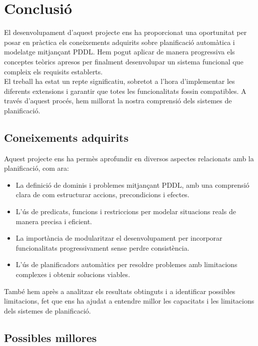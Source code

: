 \documentclass[a4paper]{article}
\begin{document}
	\newpage
	\section{Conclusió}
	
	El desenvolupament d'aquest projecte ens ha proporcionat una oportunitat per posar en pràctica els coneixements adquirits sobre planificació automàtica i modelatge mitjançant PDDL. Hem pogut aplicar de manera progressiva els conceptes teòrics apresos per finalment desenvolupar un sistema funcional que compleix els requisits establerts.\\ 
	
	El treball ha estat un repte significatiu, sobretot a l'hora d'implementar les diferents extensions i garantir que totes les funcionalitats fossin compatibles. A través d'aquest procés, hem millorat la nostra comprensió dels sistemes de planificació.
	
	
	
	\subsection{Coneixements adquirits}
	
	Aquest projecte ens ha permès aprofundir en diversos aspectes relacionats amb la planificació, com ara:
	\begin{itemize}
		\item La definició de dominis i problemes mitjançant PDDL, amb una comprensió clara de com estructurar accions, precondicions i efectes.
		\item L'ús de predicats, funcions i restriccions per modelar situacions reals de manera precisa i eficient.
		\item La importància de modularitzar el desenvolupament per incorporar funcionalitats progressivament sense perdre consistència.
		\item L'ús de planificadors automàtics per resoldre problemes amb limitacions complexes i obtenir solucions viables.
	\end{itemize}
	
	També hem après a analitzar els resultats obtinguts i a identificar possibles limitacions, fet que ens ha ajudat a entendre millor les capacitats i les limitacions dels sistemes de planificació.
	
	
	\subsection{Possibles millores}	
\end{document}
